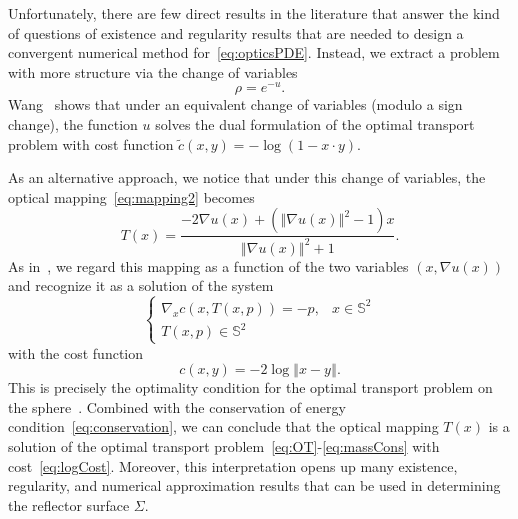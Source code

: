 \documentclass{amsart}
\newcommand{\bq}{\begin{equation}}
\newcommand{\eq}{\end{equation}}
\newcommand{\norm}[1]{\left\Vert#1\right\Vert}
\newcommand{\Sf}{\mathbb{S}^{2}}
\theoremstyle{lemma}
\theoremstyle{remark}
\begin{document}
Unfortunately, there are few direct results in the literature that answer the kind of questions of existence and regularity results that are needed to design a convergent numerical method for~\eqref{eq:opticsPDE}. Instead, we extract a problem with more structure via the change of variables
\begin{equation}\label{eq:cov}
\rho = e^{-u}.
\end{equation}
Wang~\cite{Wang_Reflector2} shows that under an equivalent change of variables (modulo a sign change), the function $u$ solves the dual formulation of the optimal transport problem with cost function $\tilde{c}(x,y) = -\log(1-x\cdot y)$.

As an alternative approach, we notice that under this change of variables, the optical mapping~\eqref{eq:mapping2} becomes
\bq\label{eq:mappingu}
T(x) = \frac{-2\nabla u(x) + \left(\norm{\nabla u(x)}^2-1\right)x}{\norm{\nabla u(x)}^2+1}.
\eq
As in~\cite{HT_OTonSphere}, we regard this mapping as a function of the two variables $(x,\nabla u(x))$ and recognize it as a solution of the system
\bq\label{eq:optimalMap}
\begin{cases}
\nabla_x c(x,T(x,p)) = -p, & x \in \Sf\\
T(x,p) \in \Sf
\end{cases}
\eq
with the cost function 
%
%
%
\bq\label{eq:logCost}
c(x,y) = -2\log \norm{ x-y }.
\eq
This is precisely the optimality condition for the optimal transport problem on the sphere~\cite{Loeper_OTonSphere}.  Combined with the conservation of energy condition~\eqref{eq:conservation}, we can conclude that the optical mapping $T(x)$ is a solution of the optimal transport problem~\eqref{eq:OT}-\eqref{eq:massCons} with cost~\eqref{eq:logCost}.  Moreover, this interpretation opens up many existence, regularity, and numerical approximation results that can be used in determining the reflector surface $\Sigma$.
\end{document}
